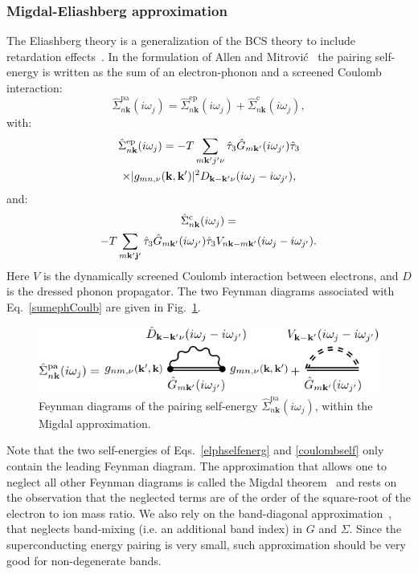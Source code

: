 \documentclass[final,3p,times,twocolumn]{elsarticle}
\begin{document}
\subsubsection{Migdal-Eliashberg approximation}
The Eliashberg theory is a generalization of the BCS theory to include retardation effects~\cite{Eliashberg1960,Eliashberg1961}.
In the formulation of Allen and Mitrovi\'c~\cite{Allen1983a} the pairing self-energy is written as the sum of an electron-phonon and a screened Coulomb interaction:
\begin{equation}\label{sumephCoulb}
\hat{\Sigma}_{n\mathbf{k}}^{\text{pa}} (i\omega_j) = \hat{\Sigma}_{n\mathbf{k}}^{\text{ep}} (i\omega_j)+ \hat{\Sigma}_{n\mathbf{k}}^{\text{c}} (i\omega_j),
\end{equation}
with:
\begin{multline}\label{elphselfenerg}
\hat{\Sigma}_{n\mathbf{k}}^{\text{ep}}(i\omega_j) = -T \sum_{m\mathbf{k'}j'\nu} \hat{\tau}_3 \hat{G}_{m\bf{k'}}(i\omega_{j'})\hat{\tau}_3 \\
\times |g_{mn,\nu}(\mathbf{k,k'})|^2 D_{\mathbf{k-k'}\nu}(i\omega_j-i\omega_{j'}),
\end{multline}
and: 
\begin{multline}\label{coulombself}
\hat{\Sigma}_{n\mathbf{k}}^{\text{c}} (i\omega_j) =\\
 -T \sum_{m\bf{k'}j'}  \hat{\tau}_3 \hat{G}_{m\bf{k'}}(i\omega_{j'})\hat{\tau}_3  V_{n\mathbf{k}-m\mathbf{k'}}(i\omega_j-i\omega_{j'}).
\end{multline}
Here $V$ is the dynamically screened Coulomb interaction between electrons, and $D$ is the dressed phonon propagator. The two Feynman diagrams associated with Eq.~\eqref{sumephCoulb} are given in Fig.~\ref{fan}.

\begin{figure}[b]
  \centering
  \includegraphics[width=0.99\linewidth]{fan.pdf}
  \caption{\label{fan} Feynman diagrams of the pairing self-energy $\hat{\Sigma}_{n\mathbf{k}}^{\text{pa}} (i\omega_j)$, within the Migdal approximation.}
\end{figure}

Note that the two self-energies of Eqs.~\eqref{elphselfenerg} and \eqref{coulombself} only contain the leading Feynman diagram. The approximation that allows one to neglect all other Feynman diagrams is called the Migdal theorem~\cite{Migdal1958} and rests on the observation that the neglected terms are of the order of the square-root of the electron to ion mass ratio. 
We also rely on the band-diagonal approximation~\cite{Allen1978a,Chakraborty1978a,Pickett1982}, that neglects band-mixing (i.e. an additional band index) in $G$ and $\Sigma$. Since the superconducting energy pairing is very small, such approximation should be very good for non-degenerate bands.   
\end{document}
